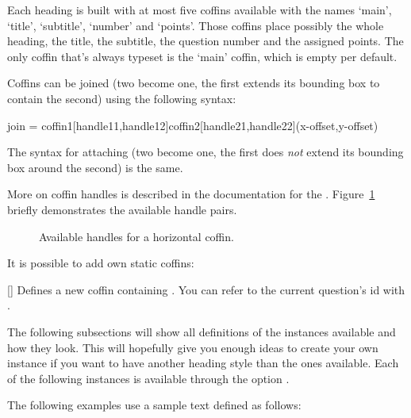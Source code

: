 \documentclass[load-preamble+]{cnltx-doc}
\begin{document}
Each heading is built with at most five coffins available with the names
`main', `title', `subtitle', `number' and `points'.  Those coffins place
possibly the whole heading, the title, the subtitle, the question number and
the assigned points.  The only coffin that's always typeset is the `main'
coffin, which is empty per default.

Coffins can be joined (two become one, the first extends its bounding box to
contain the second) using the following syntax:
\begin{sourcecode}
  join = coffin1[handle11,handle12]coffin2[handle21,handle22](x-offset,y-offset)
\end{sourcecode}
The syntax for attaching (two become one, the first does \emph{not} extend its
bounding box around the second) is the same.

More on coffin handles is described in the documentation for the
.  Figure~\ref{fig:handles} briefly demonstrates the available
handle pairs.

\begin{figure}[ht]
 \centering
 \parbox{4.5cm}{%
   \NewCoffin\ExampleCoffin
   \SetHorizontalCoffin\ExampleCoffin{\color{gray!30}\rule{4cm}{4cm}}%
   \DisplayCoffinHandles{}%
 }
 \caption{Available handles for a horizontal coffin.}\label{fig:handles}
\end{figure}

It is possible to add own static coffins:
\begin{commands}
  []
    Defines a new coffin  containing .  You can refer to
    the current question's \ac{id} with .
\end{commands}

The following subsections will show all definitions of the instances available
and how they look.  This will hopefully give you enough ideas to create your
own instance if you want to have another heading style than the ones
available.  Each of the following instances is available through the option
.

The following examples use a sample text defined as follows:
\begin{sourcecode}
  \def\s{This is some sample text we will use to create a somewhat
    longer text spanning a few lines.}
  \def\sample{\s\ \s\par\s}
\end{sourcecode}
\def\s{This is some sample text we will use to create a somewhat longer text
 spanning a few lines.}
\def\sample{\s\ \s\par\s}
\end{document}
